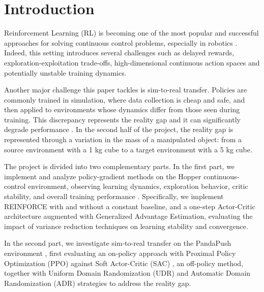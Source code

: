 \section{Introduction}

Reinforcement Learning (RL) is becoming one of the most popular and successful approaches for solving continuous control
problems, especially in robotics \cite{Kober2013}.
Indeed, this setting introduces several challenges such as delayed rewards, exploration-exploitation trade-offs,
high-dimensional continuous action spaces and potentially unstable training dynamics.

Another major challenge this paper tackles is sim-to-real transfer. Policies are commonly trained in simulation, where data
collection is cheap and safe, and then applied to environments whose dynamics differ from those seen during training.
This discrepancy represents the reality gap and it can significantly degrade performance \cite{Tobin2017}.
In the second half of the project, the reality gap is represented through a variation in the mass of a manipulated object:
from a source environment with a 1 kg cube to a target environment with a 5 kg cube.

The project is divided into two complementary parts. In the first part, we implement and analyze policy-gradient methods on
the Hopper continuous-control environment, observing learning dynamics, exploration behavior, critic stability, and overall
training performance \cite{Brockman2016, Todorov2012}. Specifically, we implement REINFORCE \cite{Williams1992} with and without a constant baseline, and a one-step Actor-Critic architecture
augmented with Generalized Advantage Estimation, evaluating the impact of variance reduction techniques on learning stability and convergence.

In the second part, we investigate sim-to-real transfer on the PandaPush environment \cite{gallouedec2021pandagym}, first evaluating an on-policy approach with Proximal Policy Optimization (PPO) \cite{SchulmanPPO2017}
against Soft Actor-Critic (SAC) \cite{SAC2018}, an off-policy method, together with Uniform Domain Randomization (UDR) and Automatic Domain Randomization (ADR) \cite{rubikADR2019}
strategies to address the reality gap.

